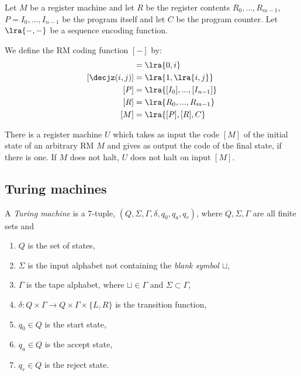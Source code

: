 \documentclass{article}
\begin{document}
\begin{definition}
	Let $M$ be a register machine and let $R$ be the register contents $R_0,...,R_{m-1}$,
	$P=I_0,...,I_{n-1}$ be the program itself and let $C$ be the program counter.
	Let $\lra{-,-}$ be a sequence encoding function.

	We define the RM coding function $[-]$ by:
	\begin{align*}
		[\inc(i)]     & = \lra{0,i}                   \\
		[\decjz(i,j)] & = \lra{1,\lra{i,j}}           \\
		[P]           & = \lra{[I_0], ..., [I_{n-1}]} \\
		[R]           & = \lra{R_0, ..., R_{m-1}}     \\
		[M]           & = \lra{[P], [R], C}
	\end{align*}
\end{definition}

\begin{theorem}[Notes I.7]
	There is a register machine $U$ which takes as input the code $\left[M\right]$ of the
	initial state of an arbitrary RM $M$ and gives as output the code of the final
	state, if there is one. If $M$ does not halt, $U$ does not halt on input
	$\left[M\right]$.
\end{theorem}

\subsection{Turing machines}

\begin{definition}
	A \emph{Turing machine} is a 7-tuple, $(Q, \Sigma, \Gamma, \delta, q_0, q_a, q_r)$,
	where $Q,\Sigma,\Gamma$ are all finite sets and
	\begin{enumerate}
		\item $Q$ is the set of states,
		\item $\Sigma$ is the input alphabet not containing the \emph{blank symbol $\sqcup$},
		\item $\Gamma$ is the tape alphabet, where $\sqcup\in\Gamma$ and $\Sigma\subset\Gamma$,
		\item $\delta:Q\times\Gamma\to Q\times\Gamma\times\{L,R\}$ is the transition function,
		\item $q_0\in Q$ is the start state,
		\item $q_a\in Q$ is the accept state,
		\item $q_r\in Q$ is the reject state.
	\end{enumerate}
\end{definition}
\end{document}
